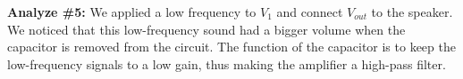 \hfill \newline
\textbf{Analyze \#5:} \newline
\phantom{ } We applied a low frequency to $ V_1 $ and connect $ V_{out} $ to the speaker. We noticed that this low-frequency sound had a bigger volume when the capacitor is removed from the circuit. The function of the capacitor is to keep the low-frequency signals to a low gain, thus making the amplifier a high-pass filter.
